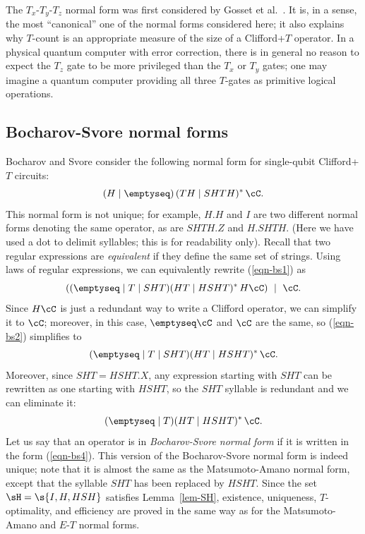 \documentclass{article}
\begin{document}
The $T_x$-$T_y$-$T_z$ normal form was first considered by Gosset et
al.~{\cite[Section 4]{Gosset-etal}}. It is, in a sense, the most
``canonical'' one of the normal forms considered here; it also
explains why $T$-count is an appropriate measure of the size of a
Clifford+$T$ operator. In a physical quantum computer with error
correction, there is in general no reason to expect the $T_z$ gate to
be more privileged than the $T_x$ or $T_y$ gates; one may imagine a
quantum computer providing all three $T$-gates as primitive logical
operations.

\subsection{Bocharov-Svore normal forms}

Bocharov and Svore {\cite[Prop.1]{BS}} consider the following normal
form for single-qubit Clifford+$T$ circuits:
\begin{equation}\label{eqn-bs1}
  (H\mid\emptyseq)\,(TH\mid SHTH)^*\,{\cC}.
\end{equation}
This normal form is not unique; for example, $H.H$ and $I$ are two
different normal forms denoting the same operator, as are $SHTH.Z$ and
$H.SHTH$. (Here we have used a dot to delimit syllables; this is for
readability only). Recall that two regular expressions are {\em
  equivalent} if they define the same set of strings. Using laws of
regular expressions, we can equivalently rewrite (\ref{eqn-bs1}) as
\begin{equation}\label{eqn-bs2}
  ((\emptyseq\mid T\mid SHT) (HT\mid HSHT)^*\,H{\cC}) ~\mid~ \cC.
\end{equation}
Since $H\cC$ is just a redundant way to write a Clifford operator, we
can simplify it to $\cC$; moreover, in this case, $\emptyseq\cC$ and
$\cC$ are the same, so (\ref{eqn-bs2}) simplifies to
\begin{equation}\label{eqn-bs3}
    (\emptyseq\mid T\mid SHT) (HT\mid HSHT)^*\,{\cC}.
\end{equation}
Moreover, since $SHT=HSHT.X$, any expression starting with $SHT$ can be
rewritten as one starting with $HSHT$, so the $SHT$ syllable is
redundant and we can eliminate it:
\begin{equation}\label{eqn-bs4}
    (\emptyseq\mid T) (HT\mid HSHT)^*\,{\cC}.
\end{equation}
Let us say that an operator is in {\em Bocharov-Svore normal form} if
it is written in the form (\ref{eqn-bs4}). This version of the
Bocharov-Svore normal form is indeed unique; note that it is almost
the same as the Matsumoto-Amano normal form, except that the syllable
$SHT$ has been replaced by $HSHT$. Since the set $\sH=\s{I,H,HSH}$
satisfies Lemma~\ref{lem-SH}, existence, uniqueness, $T$-optimality,
and efficiency are proved in the same way as for the Matsumoto-Amano
and $E$-$T$ normal forms.
\end{document}
